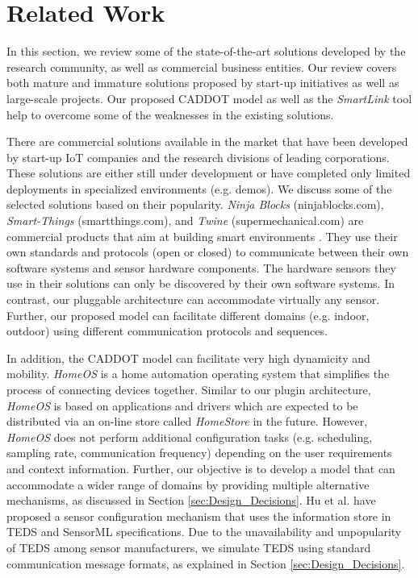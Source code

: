 \documentclass[graybox]{svmult}
\begin{document}
\vspace{-6pt}



\section{Related Work}
\label{sec:Related_Work}

In this section, we review some of the state-of-the-art solutions developed by the research community, as well as commercial business entities. Our review covers both mature and immature solutions proposed by start-up initiatives as well as large-scale projects. Our proposed CADDOT model as well as the \textit{SmartLink} tool help to overcome some of the weaknesses in the existing solutions.





There are commercial solutions available in the market that have been developed by start-up IoT companies \cite{P596} and the research divisions of leading corporations. These solutions are either still under development or have completed only limited deployments in specialized environments (e.g. demos). We discuss some of the selected solutions based on their popularity. \textit{Ninja Blocks} (ninjablocks.com), \textit{Smart-Things} (smartthings.com), and \textit{Twine} (supermechanical.com) are commercial products that aim at building smart environments \cite{P596}. They use their own standards and protocols (open or closed) to communicate between their own software systems and sensor hardware components. The hardware sensors they use in their solutions can only be discovered by their own software systems. In contrast, our pluggable architecture can accommodate virtually any sensor. Further, our proposed model can facilitate different domains (e.g. indoor, outdoor) using different communication protocols and sequences. 

In addition, the CADDOT model can facilitate very high dynamicity and mobility. \textit{HomeOS}  \cite{P597} is a home automation operating system that simplifies the process of connecting devices together. Similar to our plugin architecture, \textit{HomeOS} is based on applications and drivers which are expected to be distributed via an on-line store called \textit{HomeStore} in the future. However, \textit{HomeOS} does not perform additional configuration tasks (e.g. scheduling, sampling rate, communication frequency) depending on the user requirements and context information. Further, our objective is to develop a model that can accommodate a wider range of domains by providing multiple alternative mechanisms, as discussed in Section \ref{sec:Design_Decisions}. Hu et al. \cite{P339} have proposed a sensor configuration mechanism that uses the information store in TEDS \cite{P258} and SensorML \cite{P256} specifications. Due to the unavailability and unpopularity of TEDS among sensor manufacturers, we simulate  TEDS using standard communication message formats, as explained in Section \ref{sec:Design_Decisions}.
\end{document}
